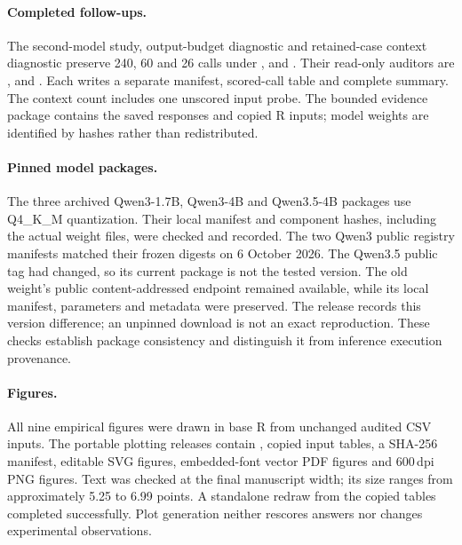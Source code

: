 \documentclass[10pt]{article}
\begin{document}
\paragraph{Completed follow-ups.} The second-model study, output-budget diagnostic and retained-case context diagnostic preserve 240, 60 and 26 calls under \protect{}, \protect{} and \protect{}. Their read-only auditors are \protect{}, \protect{} and \protect{}. Each writes a separate manifest, scored-call table and complete summary. The context count includes one unscored input probe. The bounded evidence package contains the saved responses and copied R inputs; model weights are identified by hashes rather than redistributed.

\paragraph{Pinned model packages.} The three archived Qwen3-1.7B, Qwen3-4B and Qwen3.5-4B packages use Q4\_K\_M quantization. Their local manifest and component hashes, including the actual weight files, were checked and recorded. The two Qwen3 public registry manifests matched their frozen digests on 6 October 2026. The Qwen3.5 public tag had changed, so its current package is not the tested version. The old weight's public content-addressed endpoint remained available, while its local manifest, parameters and metadata were preserved. The release records this version difference; an unpinned download is not an exact reproduction. These checks establish package consistency and distinguish it from inference execution provenance.

\paragraph{Figures.} All nine empirical figures were drawn in base R from unchanged audited CSV inputs. The portable plotting releases contain \protect{}, copied input tables, a SHA-256 manifest, editable SVG figures, embedded-font vector PDF figures and 600\,dpi PNG figures. Text was checked at the final manuscript width; its size ranges from approximately 5.25 to 6.99 points. A standalone redraw from the copied tables completed successfully. Plot generation neither rescores answers nor changes experimental observations.
\end{document}
